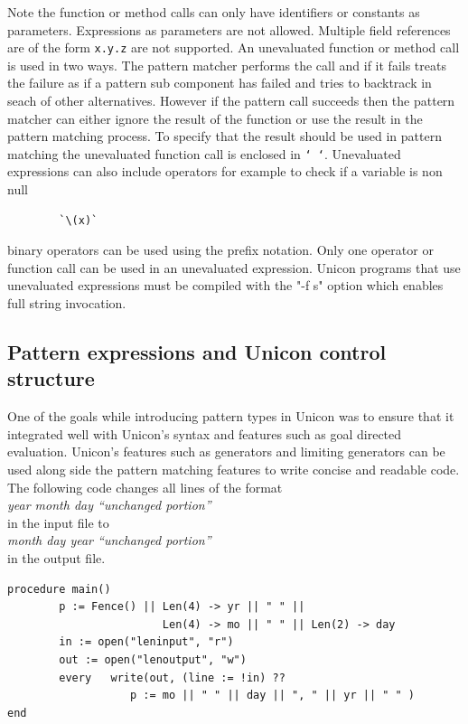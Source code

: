 \documentclass[letterpaper,12pt]{article}
\begin{document}
Note the function or method calls can only have identifiers or
constants as parameters. Expressions as parameters are not
allowed. Multiple field references are of the form \texttt{x.y.z} are
not supported. An unevaluated function or method call is used in two
ways. The pattern matcher performs the call and if it fails treats the
failure as if a pattern sub component has failed and tries to
backtrack in seach of other alternatives. However if the pattern call
succeeds then the pattern matcher can either ignore the result of the
function or use the result in the pattern matching process. To specify
that the result should be used in pattern matching the unevaluated
function call is enclosed in \texttt{` `}.  Unevaluated expressions
can also include operators for example to check if a variable is non
null

\begin{verbatim}
        `\(x)`
\end{verbatim}

binary operators can be used using the prefix notation. Only one
operator or function call can be used in an unevaluated
expression. Unicon programs that use unevaluated expressions must be
compiled with the "-f s" option which enables full string invocation.

\subsection{Pattern expressions and Unicon control structure}

One of the goals while introducing pattern types in Unicon was to
ensure that it integrated well with Unicon's syntax and features such
as goal directed evaluation. Unicon’s features such as generators and
limiting generators can be used along side the pattern matching
features to write concise and readable code.
The following code changes all lines of the format \\
	\textit{year month day “unchanged portion”} \\
in the input file to \\
	\textit{month day year “unchanged portion”} \\
in the output file.

\begin{verbatim}
procedure main()
        p := Fence() || Len(4) -> yr || " " || 
                        Len(4) -> mo || " " || Len(2) -> day
        in := open("leninput", "r")
        out := open("lenoutput", "w")
        every	write(out, (line := !in) ?? 
                   p := mo || " " || day || ", " || yr || " " )
end
\end{verbatim}
\end{document}
